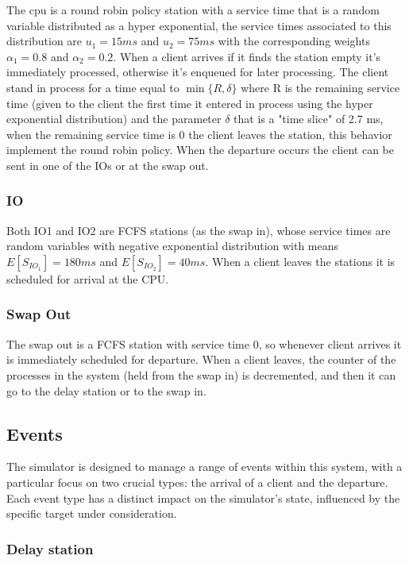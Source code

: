\documentclass[12pt,a4paper]{article}
\begin{document}
The cpu is a round robin policy station with a service time that is a random variable distributed as a hyper exponential, the service times associated to this distribution are $u_1=15ms$ and $u_2=75ms$ with the corresponding weights $\alpha_1=0.8$ and $\alpha_2=0.2$. When a client arrives if it finds the station empty it's immediately processed, otherwise it's enqueued for later processing. The client stand in process for a time equal to $\min\{R,\delta\}$ where R is the remaining service time (given to the client the first time it entered in process using the hyper exponential distribution) and the parameter $\delta$ that is a "time slice" of 2.7 ms, when the remaining service time is 0 the client leaves the station, this behavior implement the round robin policy. When the departure occurs the client can be sent in one of the IOs or at the swap out. 

\subsubsection{IO}

Both IO1 and IO2 are FCFS stations (as the swap in), whose service times are random variables with negative exponential distribution with means $E[S_{IO_1}] = 180ms$ and $E[S_{IO_2}]= 40ms$. When a client leaves the stations it is scheduled for arrival at the CPU.

\subsubsection{Swap Out}
The swap out is a FCFS station with service time 0, so whenever client arrives it is immediately scheduled for departure. When a client leaves, the counter of the processes in the system (held from the swap in) is decremented, and then it can go to the delay station or to the swap in.

\subsection{Events}
The simulator is designed to manage a range of events within this system, with a particular focus on two crucial types: the arrival of a client and the departure. Each event type has a distinct impact on the simulator's state, influenced by the specific target under consideration.
\subsubsection{Delay station}
\end{document}
